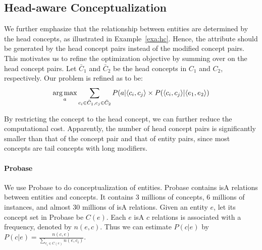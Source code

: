 \subsection{Head-aware Conceptualization}
We further emphasize that the relationship between entities are determined by the head concepts, as illustrated in Example~\ref{exa:hc}.
Hence, the attribute should be generated by the head concept pairs instead of the modified concept pairs.
This motivates us to refine the optimization objective by summing over on the head concept pairs.
Let $\bar{C}_1$ and $\bar{C}_2$ be the head concepts in  $C_1$ and $C_2$, respectively.
Our problem is refined as to be:
\begin{equation}
\label{eq:target_head}
\small
\argmax_a \sum_{c_i\in \bar{C}_1 , c_j \in \bar{C}_2 } P(a|\langle c_{i},c_{j} \rangle \times P(\langle c_{i},c_{j}\rangle|\langle e_{1},e_{2}\rangle)
\end{equation}

By restricting the concept to the head concept, we can further reduce the computational cost.
Apparently, the number of head concept pairs is significantly smaller than that of the concept pair and that of entity pairs, since most concepts are tail concepts with long modifiers.


\vspace{-4mm}
\paragraph*{Probase}
We use Probase to do conceptualization of entities. 
Probase contains isA relations between entities and concepts. It contains 3 millions of concepts, 6 millions of instances, and almost 30 millions of isA relations.
Given an entity $e$, let its concept set in Probase be $C(e)$.
Each $e$ isA $c$ relations is associated with a frequency, denoted by $n(e, c)$.
Thus we can estimate  $P(c|e)$ by
$P(c|e)=\frac{n(c,e)}{\sum_{c_i\in C(e)}n(e, c_i)}$.

